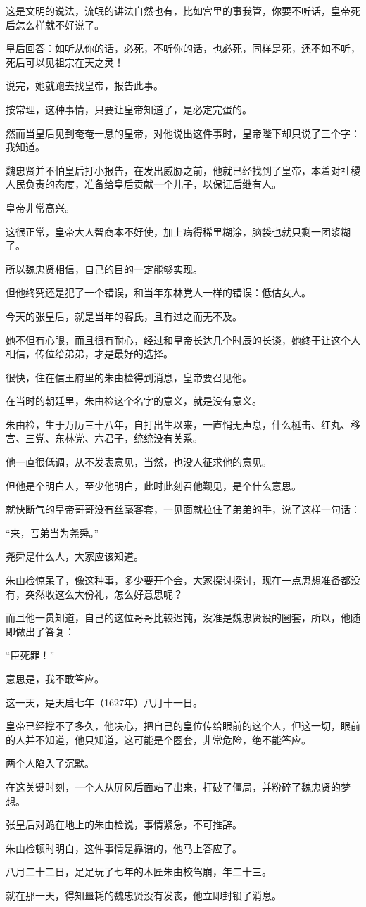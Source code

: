 \begin{multicols}{\theparacolNo}
这是文明的说法，流氓的讲法自然也有，比如宫里的事我管，你要不听话，皇帝死后怎么样就不好说了。

皇后回答：如听从你的话，必死，不听你的话，也必死，同样是死，还不如不听，死后可以见祖宗在天之灵！

说完，她就跑去找皇帝，报告此事。

按常理，这种事情，只要让皇帝知道了，是必定完蛋的。

然而当皇后见到奄奄一息的皇帝，对他说出这件事时，皇帝陛下却只说了三个字：我知道。

魏忠贤并不怕皇后打小报告，在发出威胁之前，他就已经找到了皇帝，本着对社稷人民负责的态度，准备给皇后贡献一个儿子，以保证后继有人。

皇帝非常高兴。

这很正常，皇帝大人智商本不好使，加上病得稀里糊涂，脑袋也就只剩一团浆糊了。

所以魏忠贤相信，自己的目的一定能够实现。

但他终究还是犯了一个错误，和当年东林党人一样的错误：低估女人。

今天的张皇后，就是当年的客氏，且有过之而无不及。

她不但有心眼，而且很有耐心，经过和皇帝长达几个时辰的长谈，她终于让这个人相信，传位给弟弟，才是最好的选择。

很快，住在信王府里的朱由检得到消息，皇帝要召见他。

在当时的朝廷里，朱由检这个名字的意义，就是没有意义。

朱由检，生于万历三十八年，自打出生以来，一直悄无声息，什么梃击、红丸、移宫、三党、东林党、六君子，统统没有关系。

他一直很低调，从不发表意见，当然，也没人征求他的意见。

但他是个明白人，至少他明白，此时此刻召他觐见，是个什么意思。

就快断气的皇帝哥哥没有丝毫客套，一见面就拉住了弟弟的手，说了这样一句话：

“来，吾弟当为尧舜。”

尧舜是什么人，大家应该知道。

朱由检惊呆了，像这种事，多少要开个会，大家探讨探讨，现在一点思想准备都没有，突然收这么大份礼，怎么好意思呢？

而且他一贯知道，自己的这位哥哥比较迟钝，没准是魏忠贤设的圈套，所以，他随即做出了答复：

“臣死罪！”

意思是，我不敢答应。

这一天，是天启七年（1627年）八月十一日。

皇帝已经撑不了多久，他决心，把自己的皇位传给眼前的这个人，但这一切，眼前的人并不知道，他只知道，这可能是个圈套，非常危险，绝不能答应。

两个人陷入了沉默。

在这关键时刻，一个人从屏风后面站了出来，打破了僵局，并粉碎了魏忠贤的梦想。

张皇后对跪在地上的朱由检说，事情紧急，不可推辞。

朱由检顿时明白，这件事情是靠谱的，他马上答应了。

八月二十二日，足足玩了七年的木匠朱由校驾崩，年二十三。

就在那一天，得知噩耗的魏忠贤没有发丧，他立即封锁了消息。
\ifnum{}
	\end{multicols}
